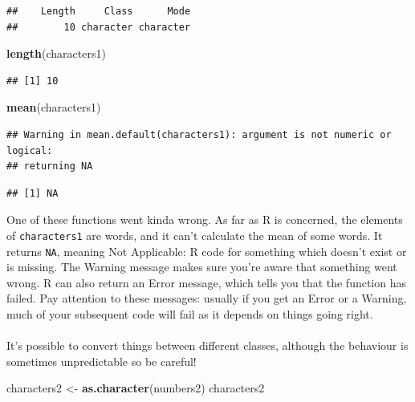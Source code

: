 \documentclass[
]{book}
\newenvironment{Shaded}{\begin{snugshade}}{\end{snugshade}}
\newcommand{\KeywordTok}[1]{\textcolor[rgb]{0.13,0.29,0.53}{\textbf{#1}}}
\newcommand{\NormalTok}[1]{#1}
\newcommand{\StringTok}[1]{\textcolor[rgb]{0.31,0.60,0.02}{#1}}
\begin{document}
\begin{verbatim}
##    Length     Class      Mode 
##        10 character character
\end{verbatim}

\begin{Shaded}
\begin{Highlighting}[]
\KeywordTok{length}\NormalTok{(characters1)}
\end{Highlighting}
\end{Shaded}

\begin{verbatim}
## [1] 10
\end{verbatim}

\begin{Shaded}
\begin{Highlighting}[]
\KeywordTok{mean}\NormalTok{(characters1)}
\end{Highlighting}
\end{Shaded}

\begin{verbatim}
## Warning in mean.default(characters1): argument is not numeric or logical:
## returning NA
\end{verbatim}

\begin{verbatim}
## [1] NA
\end{verbatim}

One of these functions went kinda wrong. As far as R is concerned, the
elements of \texttt{characters1} are words, and it can't calculate the mean of some
words. It returns \texttt{NA}, meaning Not Applicable: R code for something which
doesn't exist or is missing. The Warning message makes sure you're aware that
something went wrong. R can also return an Error message, which tells you that
the function has failed. Pay attention to these messages: usually if you get
an Error or a Warning, much of your subsequent code will fail as it depends
on things going right.\\
~\\

It's possible to convert things between different classes, although the
behaviour is sometimes unpredictable so be careful!

\begin{Shaded}
\begin{Highlighting}[]
\NormalTok{characters2 <-}\StringTok{ }\KeywordTok{as.character}\NormalTok{(numbers2)}
\NormalTok{characters2}
\end{Highlighting}
\end{Shaded}
\end{document}
